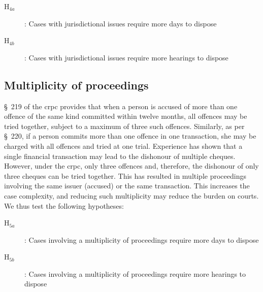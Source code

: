 \documentclass[12pt,a4paper]{article}
\begin{document}
\begin{description}
\item[H$_{4a}$]: Cases with jurisdictional issues require more days to dispose
\item[H$_{4b}$]: Cases with jurisdictional issues require more hearings to dispose
\end{description}

\subsection{Multiplicity of proceedings}

\S~219 of the \gls{crpc} provides that when a person is accused of more than one offence of the same kind committed within twelve months, all offences may be tried together, subject to a maximum of three such offences. Similarly, as per \S~220, if a person commits more than one offence in one transaction, she may be charged with all offences and tried at one trial. Experience has shown that a single financial transaction may lead to the dishonour of multiple cheques. However, under the \gls{crpc}, only three offences and, therefore, the dishonour of only three cheques can be tried together. This has resulted in multiple proceedings involving the same issuer (accused) or the same transaction. This increases the case complexity, and reducing such multiplicity may reduce the burden on courts. We thus test the following hypotheses:

\begin{description}
\item[H$_{5a}$]: Cases involving a multiplicity of proceedings require more days to dispose
\item[H$_{5b}$]: Cases involving a multiplicity of proceedings require more hearings to dispose
\end{description}
\end{document}
